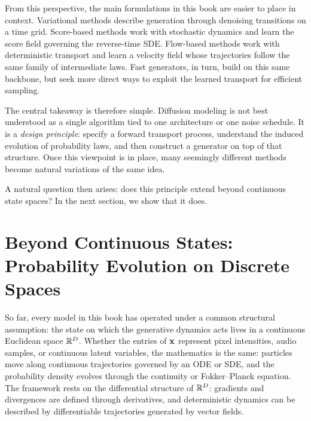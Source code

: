 From this perspective, the main formulations in this book are easier to place in context.
Variational methods describe generation through denoising transitions on a time grid. Score-based methods work with stochastic dynamics and learn the score field governing the reverse-time SDE.
Flow-based methods work with deterministic transport and learn a velocity field whose trajectories follow the same family of intermediate laws.
Fast generators, in turn, build on this same backbone, but seek more direct ways to exploit the learned transport for efficient sampling.

The central takeaway is therefore simple.
Diffusion modeling is not best understood as a single algorithm tied to one architecture or one noise schedule. It is a \emph{design principle}: specify a forward transport process, understand the induced evolution of probability laws, and then construct a generator on top of that structure. Once this viewpoint is in place, many seemingly different methods become natural variations of the same idea.

A natural question then arises: does this principle extend beyond continuous state spaces? In the next section, we show that it does.

\clearpage
\newpage


\section{Beyond Continuous States: Probability Evolution on Discrete Spaces}
\label{sec:epilogue-discrete}

So far, every model in this book has operated under a common structural
assumption: the state on which the generative dynamics acts lives in a
continuous Euclidean space $\mathbb{R}^D$. Whether the entries of ${\mathbf{x}}$ represent
pixel intensities, audio samples, or continuous latent variables, the
mathematics is the same: particles move along continuous trajectories governed
by an ODE or SDE, and the probability density evolves through the continuity or
Fokker--Planck equation. The framework rests on the differential structure of $\mathbb{R}^D$: gradients and
divergences are defined through derivatives, and deterministic dynamics can be
described by differentiable trajectories generated by vector fields.

